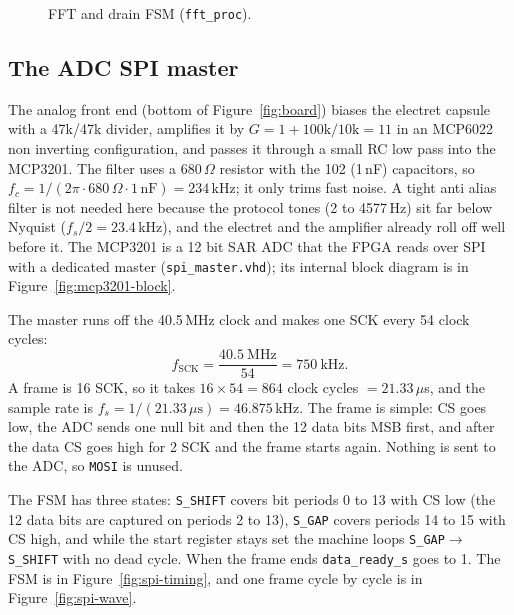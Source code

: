 \documentclass[a4paper,10pt]{article}
\begin{document}
\begin{figure}[H]
{%
}
\caption{FFT and drain FSM (\texttt{fft\_proc}).}
\label{fig:fft-fsm}
\end{figure}

\subsection{The ADC SPI master}
\label{sec:adc}

The analog front end (bottom of Figure~\ref{fig:board}) biases the electret capsule with a 47k/47k divider, amplifies it by $G = 1 + 100\mathrm{k}/10\mathrm{k}
= 11$ in an MCP6022 non inverting configuration, and passes it through a small RC low pass
into the MCP3201. The filter uses a $680\,\Omega$ resistor with the 102 (1\,nF) capacitors,
so
$f_c = 1/(2\pi \cdot 680\,\Omega \cdot 1\,\mathrm{nF}) = 234$\,kHz; it only trims fast noise.
A tight anti alias filter is not needed here because the protocol tones (2 to 4577\,Hz) sit
far below Nyquist ($f_s/2=23.4$\,kHz), and the electret and the amplifier already roll off
well before it. The MCP3201 is a 12 bit SAR ADC that the FPGA reads over SPI with a
dedicated master (\texttt{spi\_master.vhd}); its internal block diagram
is in Figure~\ref{fig:mcp3201-block}.

The master runs off the 40.5\,MHz clock and makes one SCK every 54 clock cycles:
\[
f_\mathrm{SCK} = \frac{40.5\ \mathrm{MHz}}{54} = 750\ \mathrm{kHz}.
\]
A frame is 16 SCK, so it takes $16 \times 54 = 864$ clock cycles $= 21.33\,\mu$s, and the
sample rate is $f_s = 1/(21.33\,\mu\mathrm{s}) = 46.875$\,kHz. The frame is simple: CS goes
low, the ADC sends one null bit and then the 12 data bits MSB first, and after the data CS
goes high for 2 SCK and the frame starts again. Nothing is sent to the ADC, so
\texttt{MOSI} is unused.

The FSM has three states: \texttt{S\_SHIFT} covers bit periods 0 to 13 with CS low (the 12
data bits are captured on periods 2 to 13), \texttt{S\_GAP} covers periods 14 to 15 with
CS high, and while the start register stays set the machine loops
\texttt{S\_GAP}$\to$\texttt{S\_SHIFT} with no dead cycle. When the frame ends
\texttt{data\_ready\_s} goes to 1. The FSM is in
Figure~\ref{fig:spi-timing}, and one frame cycle by cycle is in Figure~\ref{fig:spi-wave}.
\end{document}
